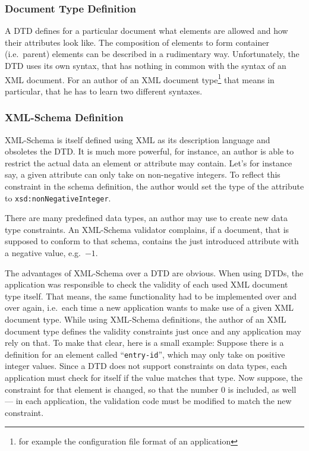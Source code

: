\subsubsection{Document Type Definition}

A DTD defines for a particular  document what elements are allowed and how
their attributes look like. The  composition of elements to form container
(i.e.~parent)   elements  can   be   described  in   a  rudimentary   way.
Unfortunately, the  DTD uses  its own syntax,  that has nothing  in common
with  the syntax of  an XML  document. For  an author  of an  XML document
type\footnote{for example the configuration file format of an application}
that means in particular, that he has to learn two different syntaxes.

\subsubsection{XML-Schema Definition}

XML-Schema is  itself defined  using XML as  its description  language and
obsoletes the  DTD. It is much  more powerful, for instance,  an author is
able  to   restrict  the   actual  data  an   element  or   attribute  may
contain.  Let's for  instance  say, a  given  attribute can  only take  on
non-negative  integers.    To  reflect  this  constraint   in  the  schema
definition,  the   author  would  set   the  type  of  the   attribute  to
\texttt{xsd:nonNegativeInteger}.

There are many predefined data types, an author may use to create new data
type constraints.  An XML-Schema validator complains, if  a document, that
is  supposed to  conform  to  that schema,  contains  the just  introduced
attribute with a negative value, e.g.~$-1$.

\bigskip

The advantages of XML-Schema over a DTD are obvious.  When using DTDs, the
application  was  responsible to  check  the  validity  of each  used  XML
document  type  itself. That  means,  the  same  functionality had  to  be
implemented over and over again, i.e.~each time a new application wants to
make use of a given XML document type. While using XML-Schema definitions,
the author of  an XML document type defines  the validity constraints just
once and any application  may rely on that. To make that  clear, here is a
small  example:  Suppose there  is  a  definition  for an  element  called
``\texttt{entry-id}'',  which may  only take  on positive  integer values.
Since a DTD  does not support constraints on  data types, each application
must check  for itself if  the value matches  that type. Now  suppose, the
constraint  for  that  element is  changed,  so  that  the number  $0$  is
included, as  well ---  in each application,  the validation code  must be
modified to match the new constraint.

